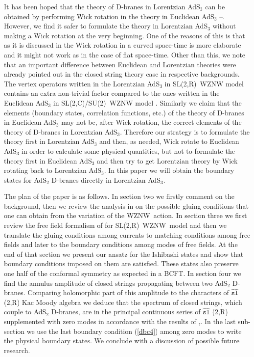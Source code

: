 \documentclass[a4paper,12pt]{article}
\begin{document}
It has been hoped that the theory of D-branes in Lorentzian AdS$_{3}$ can be
obtained by performing Wick rotation in the theory in Euclidean AdS$_{3}$
\cite{ads2d}--\cite{ponsot}. However, we find it safer to formulate the
theory in Lorentzian AdS$_{3}$ without making a Wick rotation at the very
beginning. One of the reasons of this is that as it is discussed in \cite
{roberts} the Wick rotation in a curved space-time is more elaborate and it
might not work as in the case of flat space-time. Other than this, we note
that an important difference between Euclidean and Lorentzian theories were
already pointed out in the closed string theory case in respective
backgrounds. The vertex operators written in the Lorentzian AdS$_{3}$ in
SL(2,R)\ WZNW model \cite{BDM} contains an extra non-trivial factor compared
to the ones written in the Euclidean AdS$_{3}$ in SL(2,C)/SU(2)\ WZNW model
\cite{teschner-1}. Similarly we claim that the elements (boundary states,
correlation functions, etc.) of the theory of D-branes in Euclidean AdS$_{3}$
may not be, after Wick rotation, the correct elements of the theory of
D-branes in Lorentzian AdS$_{3}$. Therefore our strategy is to formulate the
theory first in Lorentzian AdS$_{3}$ and then, as needed, Wick rotate to
Euclidean AdS$_{3}$ in order to calculate some physical quantities, but not
to formulate the theory first in Euclidean AdS$_{3}$ and then try to get
Lorentzian theory by Wick rotating back to Lorentzian AdS$_{3}$. In this
paper we will obtain the boundary states for AdS$_{2}$ D-branes directly in
Lorentzian AdS$_{3}$.

The plan of the paper is as follows. In section two we firstly comment on
the background, then we review the analysis in \cite{lomholt} on the
possible gluing conditions that one can obtain from the variation of the
WZNW\ action. In section three we first review the free field formalism of
\cite{bars1} for SL(2,R)\ WZNW\ model and then we translate the gluing
conditions among currents to matching conditions among free fields and later
to the boundary conditions among modes of free fields. At the end of that
section we present our ansatz for the Ishibashi states and show that
boundary conditions imposed on them are satisfied. These states also
preserve one half of the conformal symmetry as expected in a BCFT. In
section four we find the annulus amplitude of closed strings propagating
between two AdS$_{2}$ D-branes. Comparing holomorphic part of this amplitude
to the characters of $\widehat{\mathtt{sl}}$(2,R) Kac Moody algebra we
deduce that the spectrum of closed strings, which couple to AdS$_{2}$
D-branes, are in the principal continuous series of $\widehat{\mathtt{sl}}$%
(2,R) supplemented with zero modes in accordance with the results of \cite
{bars1},\cite{BDM}. In the last sub-section we use the last boundary
condition (\ref{dbc4}) among zero modes to write the physical boundary
states. We conclude with a discussion of possible future research.
\end{document}
